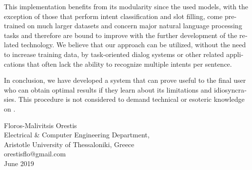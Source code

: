 \begin{english}
This implementation benefits from its modularity since the used models, with the exception of those that perform intent classification and slot filling,
come pre-trained on much larger datasets and concern major natural language processing tasks and therefore are bound to improve with the further development of the related technology.
We believe that our approach can be utilized, without the need to increase training data, by task-oriented dialog systems or other related applications that often lack the ability to recognize multiple intents per sentence.

In conclusion, we have developed a system that can prove useful to the final user who can obtain optimal results if they learn about its limitations and idiosyncrasies.
This procedure is not considered to demand technical or esoteric knowledge on \projectname{}.

\begin{flushright}
    \vspace*{\fill}%
    Floros-Malivitsis Orestis\\
    Electrical \& Computer Engineering Department,\\
    Aristotle University of Thessaloniki, Greece\\
    orestisflo@gmail.com\\
    June 2019
\end{flushright}
\end{english}

